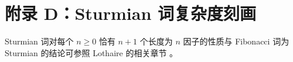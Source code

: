 \section{附录 D：Sturmian 词复杂度刻画}

Sturmian 词对每个 $n\ge 0$ 恰有 $n+1$ 个长度为 $n$ 因子的性质与 Fibonacci 词为 Sturmian 的结论可参照 Lothaire 的相关章节 \cite{CambridgeSturmianWordsLothaire}。

